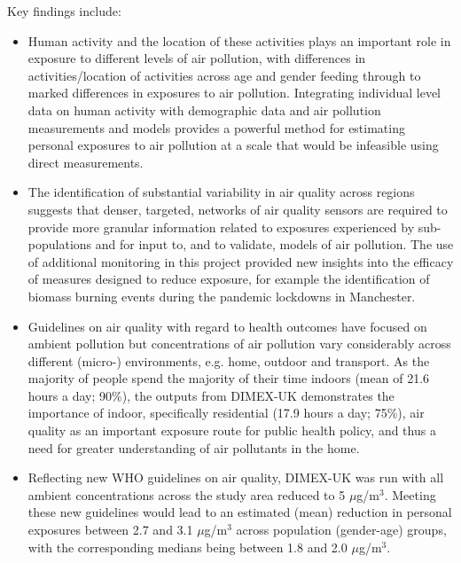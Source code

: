 \documentclass{article}
\begin{document}
\noindent Key findings include:
\begin{itemize}
\item Human activity and the location of these activities plays an important role in exposure to different levels of air pollution, with differences in activities/location of activities across age and gender feeding through to marked differences in exposures to air pollution. Integrating individual level data on human activity with demographic data and air pollution measurements and models provides a powerful method for estimating personal exposures to air pollution at a scale that would be infeasible using direct measurements.
\item The identification of substantial variability in air quality across regions suggests that denser, targeted, networks of air quality sensors are required to provide more granular information related to exposures experienced by sub-populations and for input to, and to validate, models of air pollution. The use of additional monitoring in this project provided new insights into the efficacy of measures designed to reduce exposure, for example the identification of biomass burning events during the pandemic lockdowns in Manchester.  
\item Guidelines on air quality with regard to health outcomes have focused on ambient pollution but concentrations of air pollution vary considerably across different (micro-) environments, e.g. home, outdoor and transport. As the majority of people spend the majority of their time indoors (mean of 21.6 hours a day; 90\%), the outputs from DIMEX-UK demonstrates the importance of indoor, specifically residential (17.9 hours a day; 75\%), air quality as an important exposure route for public health policy, and thus a need for greater understanding of air pollutants in the home.
\item  Reflecting new WHO guidelines on air quality, DIMEX-UK was run with all ambient concentrations across the study area reduced to 5 $\mu$g/m$^3$. Meeting these new guidelines would lead to an estimated (mean) reduction in personal exposures between 2.7 and 3.1 $\mu$g/m$^3$ across population (gender-age) groups, with the corresponding medians being between 1.8 and 2.0 $\mu$g/m$^3$.
\end{itemize}

\newpage

\end{document}
